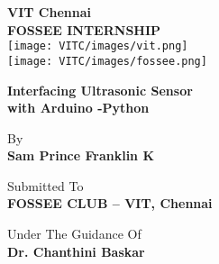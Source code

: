 \documentclass[11pt,oneside,french]{book}
\begin{document}

\frontmatter

\begin{titlepage}



\begin{center}
{\huge \bfseries VIT Chennai}\\[1.5cm]
\linespread{1.2}\huge {\bfseries FOSSEE INTERNSHIP}\\[1.5cm]
\linespread{1}
\texttt{[image: VITC/images/vit.png]}\\\texttt{[image: VITC/images/fossee.png]}\\[0.5cm]
\begin{center}
    \bfseries \huge {Interfacing Ultrasonic Sensor\\ 
     with Arduino -Python}
\end{center}
\begin{center}
     By\\
    \bfseries Sam Prince Franklin K\\  
\end{center}


\begin{center}
     Submitted To\\
    \bfseries FOSSEE CLUB – VIT, Chennai\\  
\end{center}
\begin{center}

Under The Guidance Of\\
\bfseries Dr. Chanthini Baskar\\
\end{center}
\end{center}

\end{titlepage}

\newpage


\tableofcontents
\mainmatter

\end{document}
